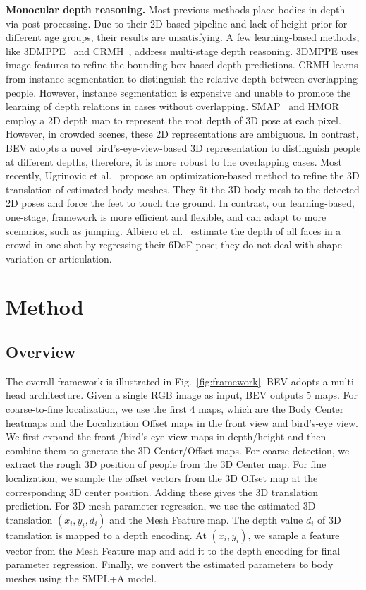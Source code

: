 \documentclass[10pt,twocolumn,letterpaper]{article}
\begin{document}
\textbf{Monocular depth reasoning. } 
Most previous methods place bodies in depth via post-processing.
Due to their 2D-based pipeline and lack of height prior for different age groups, their results are unsatisfying.
A few learning-based methods, like 3DMPPE~\cite{moon2019camera} and CRMH~\cite{jiang2020coherent}, address multi-stage depth reasoning. 
3DMPPE uses image features to refine the bounding-box-based depth predictions.
CRMH learns from instance segmentation to distinguish the relative depth between overlapping people. 
However, instance segmentation is expensive and unable to promote the learning of depth relations in cases without overlapping.
SMAP~\cite{zhen2020smap} and HMOR~\cite{wang2020hmor} employ a 2D depth map to represent the root depth of 3D pose at each pixel. 
However, in crowded scenes, these 2D representations are ambiguous.
In contrast, BEV adopts a novel bird's-eye-view-based 3D representation to distinguish people at different depths, therefore, it is more robust to the overlapping cases.
Most recently, Ugrinovic et al.~\cite{ugrinovic2021body} propose an optimization-based method to refine the 3D translation of estimated body meshes.
They fit the 3D body mesh to the detected 2D poses and force the feet to touch the ground. 
In contrast, our learning-based, one-stage, framework is more efficient and flexible, and can adapt to more scenarios, such as jumping.
Albiero et al.~\cite{albiero2021img2pose} estimate the depth of all faces in a crowd in one shot by regressing their 6DoF pose; they do not deal with shape variation or articulation.




\section{Method}
\label{sec:method}

\subsection{Overview}\label{sec:overview}

The overall framework is illustrated in Fig.~\ref{fig:framework}.
BEV adopts a multi-head architecture. 
Given a single RGB image as input, BEV outputs 5 maps.
For coarse-to-fine localization, we use the first 4 maps, which are the Body Center heatmaps and the Localization Offset maps in the front view and bird's-eye view. 
We first expand the front-/bird's-eye-view maps in depth/height  and then combine them to generate the 3D Center/Offset maps.
For coarse detection, we extract the rough 3D position of people from the 3D Center map. 
For fine localization, we sample the offset vectors from the 3D Offset map at the corresponding 3D center position. 
Adding these gives the 3D translation prediction.
For 3D mesh parameter regression, we use the estimated 3D translation $(x_i, y_i, d_i)$ and the Mesh Feature map.
The depth value $d_i$ of 3D translation is mapped to a depth encoding.
At $(x_i, y_i)$, we sample a feature vector from the Mesh Feature map and add it to the depth encoding for final parameter regression.
Finally, we convert the estimated parameters to body meshes using the SMPL+A model.
\end{document}
